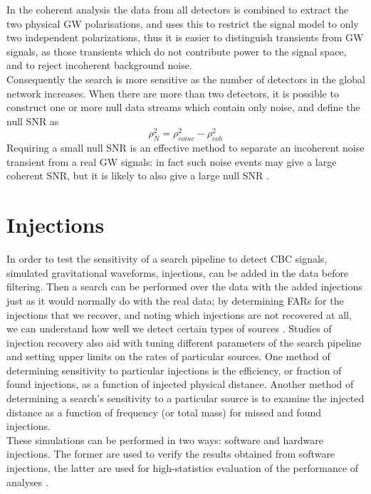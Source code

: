 \documentclass[binding=0.6cm, LaM]{sapthesis}
\begin{document}
	In the coherent analysis the data from all detectors 
	is combined to extract the two physical GW polarisations, 
	and uses this to restrict the signal model to 
	only two independent polarizations, 
	thus it is easier to distinguish transients from GW signals, 
	as those transients which do not contribute power to the signal space, and to reject incoherent background noise. \\
	Consequently the search is more sensitive as the number of detectors in the global network increases.
        When there are more than two detectors, 
	it is possible to construct one or more null data streams 
	which contain only noise, and define the null SNR as
		\begin{equation}
			\rho^2_N = \rho^2_{coinc} - \rho^2_{coh} 
		\end{equation}
	Requiring a small null SNR is an effective method to separate 
	an incoherent noise transient from a real GW signals: 
	in fact such noise events may give a large coherent SNR,
	but it is likely to also give a large null SNR \cite{45}.       

\section{Injections}

	In order to test the sensitivity of a search pipeline to detect CBC signals, 
	simulated gravitational waveforms, injections, can be added in the data before filtering.
	Then a search can be performed over the data with the added injections just as it would normally do with the real data;
	by determining FARs for the injections that we recover, 	
	and noting which injections are not recovered at all,
	we can understand how well we detect certain types of sources \cite{47, 48}.
	Studies of injection recovery also aid with tuning different parameters 
	of the search pipeline and setting upper limits on the rates of particular sources. 
	One method of determining sensitivity to particular injections is the efficiency, 
	or fraction of found injections, as a function of injected physical distance. 
	Another method of determining a search’s sensitivity to a particular source 
	is to examine the injected distance as a function of frequency 
	(or total mass) for missed and found injections. \\
	These simulations can be performed in two ways: software and hardware injections.
	The former are used to verify the results obtained from software injections, 
	the latter are used for high-statistics evaluation of the performance of analyses \cite{49}. 
\end{document}
